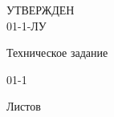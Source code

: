 
\begin{flushleft}
\begin{varwidth}{\linewidth}\centering
	\large
	УТВЕРЖДЕН \\
	{\docId} 01-1-ЛУ
\end{varwidth}
\end{flushleft}

\vskip4cm

{\Large\uppercase{\docTitle}}

\vskip1cm

{\large
	Техническое задание

	{\docId} 01-1
}

\vskip1cm

Листов \pageref*{LastPage}

\vfill
\YEAR
